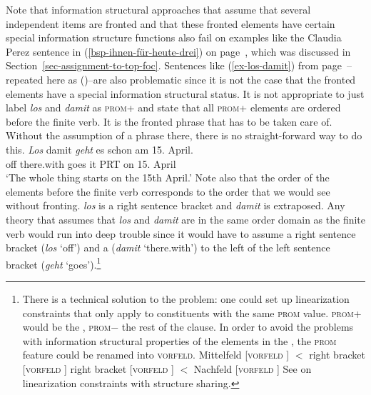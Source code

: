 \begin{exe}
\begin{xlist}
Note that information structural approaches that assume that several independent items are fronted
and that these fronted elements have certain special information structure functions also fail on examples
like the Claudia Perez sentence in (\ref{bsp-ihnen-für-heute-drei}) on page~\pageref{bsp-ihnen-für-heute-drei}, which was discussed in
Section~\ref{sec-assignment-to-top-foc}. Sentences like (\ref{ex-los-damit}) from page~\pageref{ex-los-damit}--repeated here as
()--are also problematic since it is not the case that the fronted elements have a special 
information structural status. It is not appropriate to just label \emph{los} and \emph{damit} as
\textsc{prom}+ and state that all \textsc{prom}+ elements are ordered before the finite verb.  It is the fronted phrase that has to be taken care of. Without the
assumption of a phrase there, there is no straight-forward way to do this.
\ea
\label{ex-los-damit-zwei} 
\gll \emph{Los} damit \emph{geht} es schon am 15. April.\footnotemark\\
	  off there.with goes it PRT on 15. April\\
\glt `The whole thing starts on the 15th April.'
\z
Note also that the order of the elements before the finite verb corresponds to the order that we
would see without fronting. \emph{los} is a right sentence bracket and \emph{damit} is
extraposed. Any theory that assumes that \emph{los} and \emph{damit} are in the same order domain as
the finite verb would run into deep trouble since it would have to assume a right sentence bracket
(\emph{los} `off') and a \nf (\emph{damit} `there.with') to the left of the left sentence bracket (\emph{geht} `goes').\footnote{
  There is a technical solution to the problem: one could set up linearization constraints that only apply to constituents with the same
  \textsc{prom} value. \textsc{prom}+ would be the \vf, \textsc{prom}$-$ the rest of the clause. In
  order to avoid the problems with information structural properties of the elements in the \vf, the
  \textsc{prom} feature could be renamed into \textsc{vorfeld}. 
\eal
\ex Mittelfeld [\textsc{vorfeld}  ] $<$ right bracket [\textsc{vorfeld}  ]
\ex right bracket [\textsc{vorfeld}  ] $<$ Nachfeld [\textsc{vorfeld}  ]
\zl         
See  on linearization constraints with structure sharing.
}


\end{xlist}
\end{exe}
